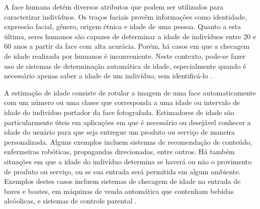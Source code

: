 
A face humana detém diversos atributos que podem ser utilizados para caracterizar indivíduos. Os traços faciais provêm informações como identidade, expressão facial, gênero, origem étnica e idade de uma pessoa. Quanto a esta última, seres humanos são capazes de determinar a idade de indivíduos entre 20 e 60 anos a partir da face com alta acurácia. Porém, há casos em que a checagem de idade realizada por humanos é inconveniente. Neste contexto, pode-se fazer uso de sistemas de determinação automática de idade, especialmente quando é necessário apenas saber a idade de um indivíduo, sem identificá-lo \cite{fu2010age}.

A estimação de idade consiste de rotular a imagem de uma face automaticamente com um número ou uma classe que corresponda a uma idade ou intervalo de idade do indivíduo portador da face fotografada. Estimadores de idade são particularmente úteis em aplicações em que é necessário ou desejável conhecer a idade do usuário para que seja entregue um produto ou serviço de maneira personalizada. Alguns exemplos incluem sistemas de recomendação de conteúdo, enfermeiras robóticas, propagandas direcionadas, entre outros. Há também situações em que a idade do indivíduo determina se haverá ou não o provimento de produto ou serviço, ou se sua entrada será permitida em algum ambiente. Exemplos destes casos incluem sistemas de checagem de idade na entrada de bares e boates, em máquinas de venda automática que contenham bebidas alcóolicas, e sistemas de controle parental \cite{fu2010age}.

%

